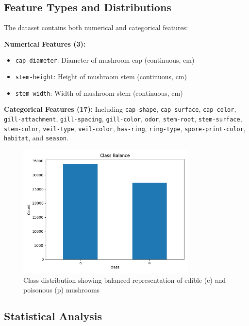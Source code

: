 \documentclass[11pt,a4paper]{article}
\begin{document}
\subsection{Feature Types and Distributions}

The dataset contains both numerical and categorical features:

\textbf{Numerical Features (3):}
\begin{itemize}
    \item \texttt{cap-diameter}: Diameter of mushroom cap (continuous, cm)
    \item \texttt{stem-height}: Height of mushroom stem (continuous, cm)  
    \item \texttt{stem-width}: Width of mushroom stem (continuous, cm)
\end{itemize}

\textbf{Categorical Features (17):}
Including \texttt{cap-shape}, \texttt{cap-surface}, \texttt{cap-color}, \texttt{gill-attachment}, \texttt{gill-spacing}, \texttt{gill-color}, \texttt{odor}, \texttt{stem-root}, \texttt{stem-surface}, \texttt{stem-color}, \texttt{veil-type}, \texttt{veil-color}, \texttt{has-ring}, \texttt{ring-type}, \texttt{spore-print-color}, \texttt{habitat}, and \texttt{season}.

\begin{figure}[H]
    \centering
    \includegraphics[width=0.8\textwidth]{figures/eda_class_balance.png}
    \caption{Class distribution showing balanced representation of edible (e) and poisonous (p) mushrooms}
    \label{fig:class_balance}
\end{figure}

\subsection{Statistical Analysis}
\end{document}
